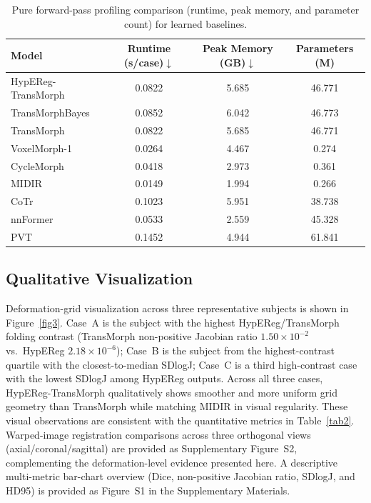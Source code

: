 \documentclass[jimaging,article,submit,pdftex,moreauthors]{Definitions/mdpi}
\begin{document}
\begin{table}[H]
\caption{Pure forward-pass profiling comparison (runtime, peak memory, and parameter count) for learned baselines.\label{tab3}}
\begin{tabularx}{\textwidth}{lccc}
\toprule
\textbf{Model} & \textbf{Runtime (s/case)\(\downarrow\)} & \textbf{Peak Memory (GB)\(\downarrow\)} & \textbf{Parameters (M)}\\
\midrule
HypEReg-TransMorph & 0.0822 & 5.685 & 46.771 \\
TransMorphBayes & 0.0852 & 6.042 & 46.773 \\
TransMorph & 0.0822 & 5.685 & 46.771 \\
VoxelMorph-1 & 0.0264 & 4.467 & 0.274 \\
CycleMorph & 0.0418 & 2.973 & 0.361 \\
MIDIR & 0.0149 & 1.994 & 0.266 \\
CoTr & 0.1023 & 5.951 & 38.738 \\
nnFormer & 0.0533 & 2.559 & 45.328 \\
PVT & 0.1452 & 4.944 & 61.841 \\
\bottomrule
\end{tabularx}
\end{table}

\subsection{Qualitative Visualization}
Deformation-grid visualization across three representative subjects is shown in Figure~\ref{fig3}. Case~A is the subject with the highest HypEReg/TransMorph folding contrast (TransMorph non-positive Jacobian ratio \(1.50\times10^{-2}\) vs.\ HypEReg \(2.18\times10^{-6}\)); Case~B is the subject from the highest-contrast quartile with the closest-to-median SDlogJ; Case~C is a third high-contrast case with the lowest SDlogJ among HypEReg outputs. Across all three cases, HypEReg-TransMorph qualitatively shows smoother and more uniform grid geometry than TransMorph while matching MIDIR in visual regularity. These visual observations are consistent with the quantitative metrics in Table~\ref{tab2}. Warped-image registration comparisons across three orthogonal views (axial/coronal/sagittal) are provided as Supplementary Figure~S2, complementing the deformation-level evidence presented here. A descriptive multi-metric bar-chart overview (Dice, non-positive Jacobian ratio, SDlogJ, and HD95) is provided as Figure~S1 in the Supplementary Materials.
\end{document}

